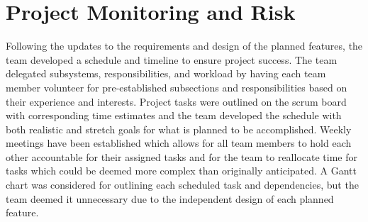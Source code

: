 \documentclass{scrreprt}
\begin{document}
\chapter{Project Monitoring and Risk}

Following the updates to the requirements and design of the planned features, the team developed a schedule and timeline to ensure project success. The team delegated subsystems, responsibilities, and workload by having each team member volunteer for pre-established subsections and responsibilities based on their experience and interests. Project tasks were outlined on the scrum board with corresponding time estimates and the team developed the schedule with both realistic and stretch goals for what is planned to be accomplished. Weekly meetings have been established which allows for all team members to hold each other accountable for their assigned tasks and for the team to reallocate time for tasks which could be deemed more complex than originally anticipated. A Gantt chart was considered for outlining each scheduled task and dependencies, but the team deemed it unnecessary due to the independent design of each planned feature.
\end{document}
